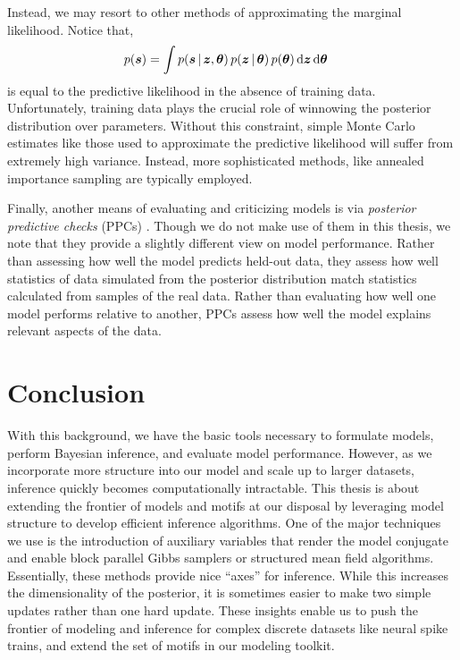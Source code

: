 Instead, we may resort to other methods of approximating the marginal
likelihood. Notice that,
\begin{align}
  \label{eq:marginal_likelihood}
  p(\boldsymbol{s})
  &= \int p(\boldsymbol{s} \,|\, \boldsymbol{z}, \boldsymbol{\theta}) \,
  p(\boldsymbol{z} \,|\, \boldsymbol{\theta}) \,
  p(\boldsymbol{\theta}) \,
  \mathrm{d}\boldsymbol{z} \, \mathrm{d} \boldsymbol{\theta}
\end{align}
is equal to the predictive likelihood
in the absence of training data. Unfortunately, training data plays the crucial
role of winnowing the posterior distribution over parameters. Without this constraint, simple Monte Carlo estimates
like those used to approximate the predictive likelihood will suffer from
extremely high variance. Instead, more sophisticated methods, like annealed
importance sampling \citep{neal2001annealed} are typically employed. 

Finally, another means of evaluating and criticizing models is via
\emph{posterior predictive checks} (PPCs) \citep{box1980sampling,
  Gelman13, blei2014build}.  Though we do not make use of them in this
thesis, we note that they provide a slightly different view on model
performance. Rather than assessing how well the model predicts
held-out data, they assess how well statistics of data simulated from
the posterior distribution match statistics calculated from samples of
the real data. Rather than evaluating how well one model performs
relative to another, PPCs assess how well the model explains relevant
aspects of the data.

\section{Conclusion}
With this background, we have the basic tools necessary to formulate
models, perform Bayesian inference, and evaluate model performance.
However, as we incorporate more structure into our model and scale up
to larger datasets, inference quickly becomes computationally
intractable. This thesis is about extending the frontier of models and
motifs at our disposal by leveraging model structure to develop
efficient inference algorithms. One of the major techniques we use is
the introduction of auxiliary variables that render the model
conjugate and enable block parallel Gibbs samplers or structured mean
field algorithms. Essentially, these methods provide nice ``axes'' for
inference. While this increases the dimensionality of the posterior,
it is sometimes easier to make two simple updates rather than one hard
update.  These insights enable us to push the frontier of modeling and
inference for complex discrete datasets like neural spike trains, and
extend the set of motifs in our modeling toolkit.
